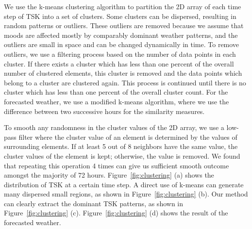 We use the k-means clustering algorithm to partition the 2D array of each time step of TSK into a set of clusters. Some clusters can be dispersed, resulting in random patterns or outliers. These outliers are removed because we assume that moods are affected mostly by comparably dominant weather patterns, and the outliers are small in space and can be changed dynamically in time. To remove outliers, we use a filtering process based on the number of data points in each cluster. If there exists a cluster which has less than one percent of the overall number of clustered elements, this cluster is removed and the data points which belong to a cluster are clustered again. This process is continued until there is no cluster which has less than one percent of the overall cluster count. For the forecasted weather, we use a modified k-means algorithm, where we use the difference between two successive hours for the similarity measures.

%


To smooth any randomness in the cluster values of the 2D array, we use a low-pass filter where the cluster value of an element is determined by the values of surrounding elements.
If at least 5 out of 8 neighbors have the same value, the cluster values of the element is kept; otherwise, the value is removed. We found that repeating this operation 4 times can give us sufficient smooth outcome amongst the majority of 72 hours.
Figure~\ref{fig:clustering} (a) shows the distribution of TSK at a certain time step. A direct use of k-means can generate many dispersed small regions, as shown in Figure~\ref{fig:clustering} (b). Our method can clearly extract the dominant TSK patterns, as shown in Figure~\ref{fig:clustering} (c). Figure~\ref{fig:clustering} (d) shows the result of the forecasted weather.

